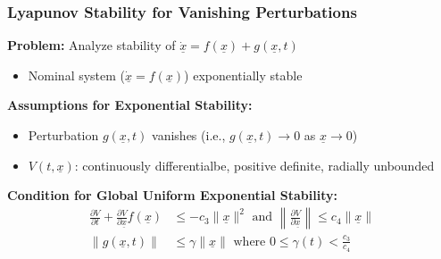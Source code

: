 \documentclass[student, noshadow, lsr, english, aspectratio=169, t]{ITR_LSR_slides}
\begin{document}
\begin{frame}
    \frametitle{Lyapunov Stability for Vanishing Perturbations}

    \textbf{Problem:} Analyze stability of $\dot{\underline{x}} = f(\underline{x}) + g(\underline{x}, t)$
    \begin{itemize}
        \item Nominal system ($\dot{\underline{x}} = f(\underline{x})$) exponentially stable
    \end{itemize}
	\vspace{0.3cm}
    \textbf{Assumptions for Exponential Stability:}
    \begin{itemize}
        \item Perturbation $g(\underline{x}, t)$ vanishes (i.e., $g(\underline{x}, t) \to 0$ as $\underline{x} \to 0$)
        \item $V(t,\underline{x})$: continuously differentialbe, positive definite, radially unbounded
    \end{itemize}
    \vspace{0.3cm} %
    \textbf{Condition for Global Uniform Exponential Stability:}
    \begin{align*}
        \frac{\partial V}{\partial t}+\frac{\partial V}{\partial \underline{x}}f(\underline{x}) &\leq -c_3\|\underline{x}\|^2 \text{ and } \left\|\frac{\partial V}{\partial \underline{x}}\right\| \leq c_4\|\underline{x}\| \\[0.5em]
        \|g(\underline{x},t)\| &\leq \gamma\|\underline{x}\| \text{ where } 0 \leq \gamma(t) < \frac{c_3}{c_4}
    \end{align*}

\end{frame}


\end{document}
